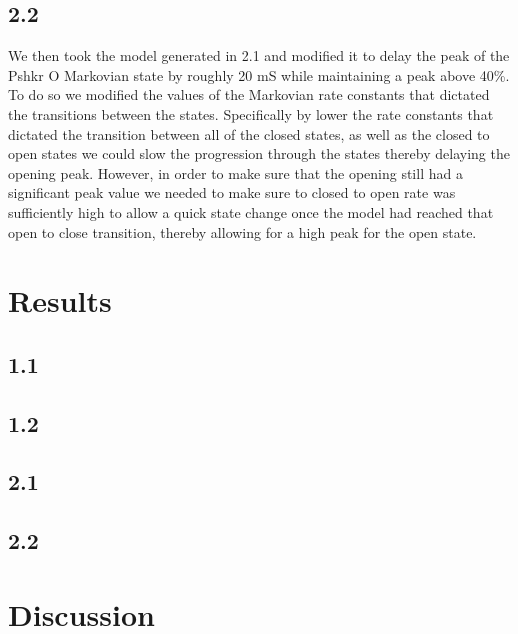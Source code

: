 \documentclass[11pt]{article}
\begin{document}
\subsection{2.2}
We then took the model generated in 2.1 and modified it to delay the peak of the Pshkr O Markovian state by roughly 20 mS while maintaining a peak above 40\%. To do so we modified the values of the Markovian rate constants that dictated the transitions between the states. Specifically by lower the rate constants that dictated the transition between all of the closed states, as well as the closed to open states we could slow the progression through the states thereby delaying the opening peak. However, in order to make sure that the opening still had a significant peak value we needed to make sure to closed to open rate was sufficiently high to allow a quick state change once the model had reached that open to close transition, thereby allowing for a high peak for the open state.

\section{Results}

\subsection{1.1}

\subsection{1.2}

\subsection{2.1}

\subsection{2.2}



\section{Discussion} 





\end{document}
